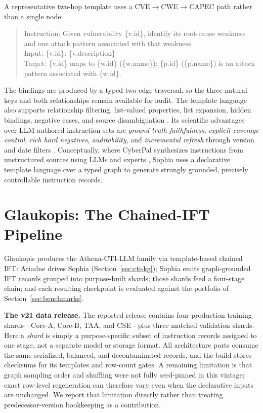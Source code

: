 \documentclass[conference]{IEEEtran}
\begin{document}
A representative two-hop template uses a CVE$\to$CWE$\to$CAPEC path rather than a single node:

\begin{quote}\scriptsize\ttfamily\sloppy\setlength{\rightskip}{0pt plus 2em}\noindent
Instruction: Given vulnerability \{v.id\}, identify its root-cause weakness and one attack pattern associated with that weakness.\\
Input: \{v.id\}: \{v.description\}\\
Target: \{v.id\} maps to \{w.id\} (\{w.name\}); \{p.id\} (\{p.name\}) is an attack pattern associated with \{w.id\}.
\end{quote}

\noindent The bindings are produced by a typed two-edge traversal, so the three natural keys and both relationships remain available for audit. The template language also supports relationship filtering, list-valued properties, list expansion, hidden bindings, negative cases, and source disambiguation \cite{cardei2025ift}. Its scientific advantages over LLM-authored instruction sets are \emph{ground-truth faithfulness}, \emph{explicit coverage control}, \emph{rich hard negatives}, \emph{auditability}, and \emph{incremental refresh} through version and date filters \cite{cardei2025ift,alam2025athenabench}. Conceptually, where CyberPal synthesizes instructions from unstructured sources using LLMs and experts \cite{levi2024cyberpal,levi2025toward}, Sophia uses a declarative template language over a typed graph to generate strongly grounded, precisely controllable instruction records.

\section{Glaukopis: The Chained-IFT Pipeline}
\label{sec:glaukopis}

Glaukopis produces the Athena-CTI-LLM family via template-based chained IFT: Ariadne drives Sophia (Section~\ref{sec:cti-kg}); Sophia emits graph-grounded IFT records grouped into purpose-built shards; those shards feed a four-stage chain; and each resulting checkpoint is evaluated against the portfolio of Section~\ref{sec:benchmarks}.

\textbf{The v21 data release.} The reported release contains four production training shards---Core-A, Core-B, TAA, and CSE---plus three matched validation shards. Here a \emph{shard} is simply a purpose-specific subset of instruction records assigned to one stage, not a separate model or storage format. All architecture ports consume the same serialized, balanced, and decontaminated records, and the build stores checksums for its templates and row-count gates. A remaining limitation is that graph sampling order and shuffling were not fully seed-pinned in this vintage; exact row-level regeneration can therefore vary even when the declarative inputs are unchanged. We report that limitation directly rather than treating predecessor-version bookkeeping as a contribution.
\end{document}
